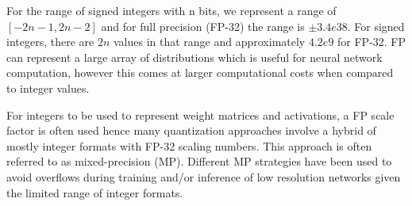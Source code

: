 For the range of signed integers with n bits, we represent a range of $[-2n-1, 2n-2]$ and for
full precision (FP-32) the range is $\pm3.4e38$. For signed integers, there are $2n$ values in that
range and approximately $4.2e9$ for FP-32. FP can represent a large array of distributions which is
useful for neural network computation, however this comes at larger computational costs when compared
to integer values.

For integers to be used to represent weight matrices and activations, a FP scale factor is often used
hence many quantization approaches involve a hybrid of mostly integer formats with FP-32 scaling
numbers. This approach is often referred to as mixed-precision (MP). Different MP strategies have
been used to avoid overflows during training and/or inference of low resolution networks given the
limited range of integer formats.

